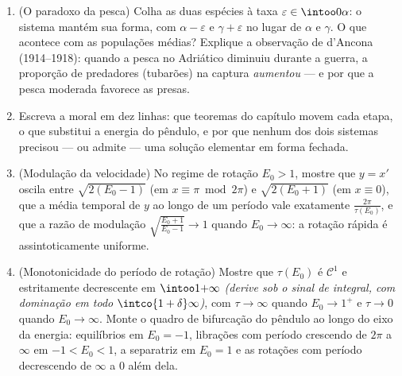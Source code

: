 \begin{problem}
\begin{enumerate}[resume]
{        período)}.
  \item (O paradoxo da pesca) Colha as duas espécies à taxa $\varepsilon \in \intoo0\alpha$: o
        sistema mantém sua forma, com $\alpha - \varepsilon$ e $\gamma +
        \varepsilon$ no lugar de
        $\alpha$ e $\gamma$. O que acontece com as populações
        médias? Explique a observação de d'Ancona (1914--1918): quando
        a pesca no Adriático diminuiu durante a guerra, a proporção de
        predadores (tubarões) na captura \emph{aumentou} --- e por que a
        pesca moderada favorece as presas.
  \item Escreva a moral em dez linhas: que teoremas do capítulo movem
        cada etapa, o que substitui a energia do pêndulo, e por que
        nenhum dos dois sistemas precisou --- ou admite --- uma solução
        elementar em forma fechada.

  \item (Modulação da velocidade) No regime de rotação $E_0 > 1$, mostre que
        $y = x'$ oscila entre $\sqrt{2(E_0 - 1)}$ (em $x \equiv \pi \bmod 2\pi$) e $\sqrt{2(E_0 + 1)}$ (em $x \equiv 0$),
        que a média temporal de $y$ ao longo de um período vale
        exatamente $\frac{2\pi}{\tau(E_0)}$, e que a razão de modulação $\sqrt{\frac{E_0 + 1}{E_0 - 1}} \to 1$ quando $E_0
        \to \infty$:
        a rotação rápida é assintoticamente uniforme.
  \item (Monotonicidade do período de rotação) Mostre que $\tau(E_0)$ é $\mathcal C^1$
        e estritamente decrescente em $\intoo1{+\infty}$ \emph{(derive sob o sinal de
        integral, com dominação em todo $\intco{1 + \delta}\infty$)}, com $\tau \to \infty$ quando $E_0 \to 1^+$ e
        $\tau
        \to 0$ quando $E_0 \to \infty$. Monte o quadro  de bifurcação do
        pêndulo ao longo do eixo da energia: equilíbrios em $E_0 = -1$,
        librações com período crescendo de $2\pi$ a $\infty$ em
        $-1 < E_0 < 1$, a separatriz em $E_0 = 1$ e as rotações com período
        decrescendo de $\infty$ a $0$ além dela.
\end{enumerate}
\end{problem}
